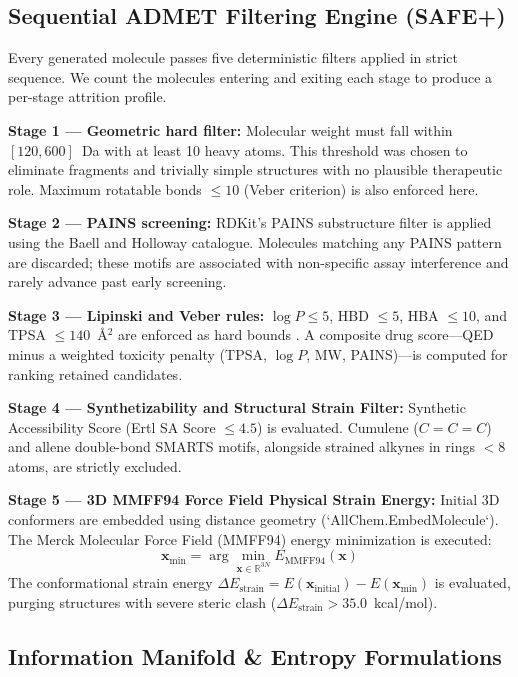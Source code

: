 \documentclass[conference]{IEEEtran}
\begin{document}
\subsection{Sequential ADMET Filtering Engine (SAFE+)}

Every generated molecule passes five deterministic filters applied in strict sequence. We count the molecules entering and exiting each stage to produce a per-stage attrition profile.

\textbf{Stage 1 --- Geometric hard filter:} Molecular weight must fall within $[120, 600]$~Da with at least 10 heavy atoms. This threshold was chosen to eliminate fragments and trivially simple structures with no plausible therapeutic role. Maximum rotatable bonds $\leq 10$ (Veber criterion) is also enforced here.

\textbf{Stage 2 --- PAINS screening:} RDKit's PAINS substructure filter is applied using the Baell and Holloway catalogue. Molecules matching any PAINS pattern are discarded; these motifs are associated with non-specific assay interference and rarely advance past early screening.

\textbf{Stage 3 --- Lipinski and Veber rules:} $\log P \leq 5$, HBD $\leq 5$, HBA $\leq 10$, and TPSA $\leq 140$~\AA$^2$ are enforced as hard bounds \cite{ref15}. A composite drug score---QED minus a weighted toxicity penalty (TPSA, $\log P$, MW, PAINS)---is computed for ranking retained candidates.

\textbf{Stage 4 --- Synthetizability and Structural Strain Filter:} Synthetic Accessibility Score (Ertl SA Score $\le 4.5$) is evaluated. Cumulene ($C{=}C{=}C$) and allene double-bond SMARTS motifs, alongside strained alkynes in rings $<8$ atoms, are strictly excluded.

\textbf{Stage 5 --- 3D MMFF94 Force Field Physical Strain Energy:} Initial 3D conformers are embedded using distance geometry (`AllChem.EmbedMolecule`). The Merck Molecular Force Field (MMFF94) \cite{ref18} energy minimization is executed:
\begin{equation}
\mathbf{x}_{\text{min}} = \arg\min_{\mathbf{x} \in \mathbb{R}^{3N}} E_{\text{MMFF94}}(\mathbf{x})
\end{equation}
The conformational strain energy $\Delta E_{\text{strain}} = E(\mathbf{x}_{\text{initial}}) - E(\mathbf{x}_{\text{min}})$ is evaluated, purging structures with severe steric clash ($\Delta E_{\text{strain}} > 35.0$~kcal/mol).

\subsection{Information Manifold \& Entropy Formulations}
\end{document}
